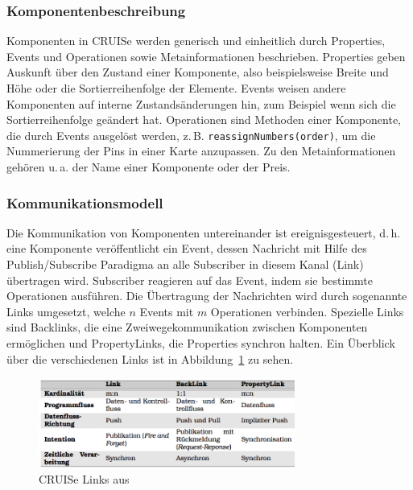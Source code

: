 \documentclass[
	headsepline,
	footsepline,
	fontsize=12pt,
	bibliography=totoc
]{scrbook}
\begin{document}
\subsubsection{Komponentenbeschreibung}
\label{section:standderforschung:grundlagen:cruise_vizboard:komponentenbeschreibung}

Komponenten in CRUISe werden generisch und einheitlich durch Properties, Events und Operationen sowie Metainformationen beschrieben. Properties geben Auskunft über den Zustand einer Komponente, also beispielsweise Breite und Höhe oder die Sortierreihenfolge der Elemente. Events weisen andere Komponenten auf interne Zustandsänderungen hin, zum Beispiel wenn sich die Sortierreihenfolge geändert hat. Operationen sind Methoden einer Komponente, die durch Events ausgelöst werden, z.\,B. \texttt{reassignNumbers(order)}, um die Nummerierung der Pins in einer Karte anzupassen. Zu den Metainformationen gehören u.\,a. der Name einer Komponente oder der Preis.

\subsubsection{Kommunikationsmodell}
\label{section:standderforschung:grundlagen:cruise_vizboard:kommunikationsmodell}

Die Kommunikation von Komponenten untereinander ist ereignisgesteuert, d.\,h. eine Komponente veröffentlicht ein Event, dessen Nachricht mit Hilfe des Publish/Subscribe Paradigma an alle Subscriber in diesem Kanal (Link) übertragen wird. Subscriber reagieren auf das Event, indem sie bestimmte Operationen ausführen. Die Übertragung der Nachrichten wird durch sogenannte Links umgesetzt, welche $n$ Events mit $m$ Operationen verbinden. Spezielle Links sind Backlinks, die eine Zweiwegekommunikation zwischen Komponenten ermöglichen und PropertyLinks, die Properties synchron halten. Ein Überblick über die verschiedenen Links ist in Abbildung~\ref{figure:cruise_links} zu sehen.

\begin{figure}[htbp]
	\centering
	\includegraphics[width=0.75\textwidth]{images/grundlagen-cruise_links.png}
	\caption{CRUISe Links aus \cite{Pietschmann2012}}
	\label{figure:cruise_links}
\end{figure}
\end{document}
